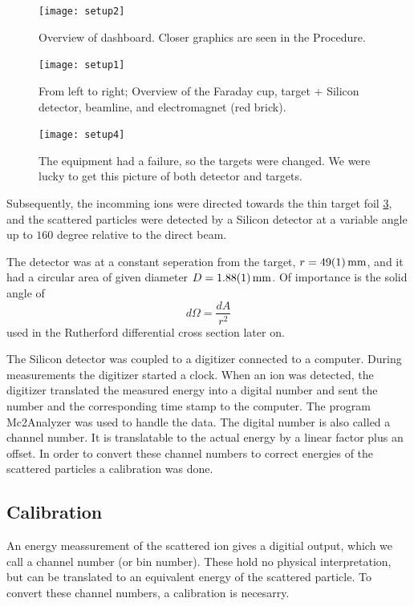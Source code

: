%
\begin{figure}[t]
    \centering
    \texttt{[image: setup2]}
    \caption{Overview of dashboard. Closer graphics are seen in the Procedure.}
    \label{fig_setup2}
\end{figure}
%
\begin{figure}[t]
    \centering
    \texttt{[image: setup1]}
    \caption{From left to right; Overview of the Faraday cup, target + Silicon detector, beamline, and electromagnet (red brick).}
    \label{fig_setup1}
\end{figure}
%
\begin{figure}[t]
    \centering
    \texttt{[image: setup4]}
    \caption{The equipment had a failure, so the targets were changed. We were
    lucky to get this picture of both detector and targets.}
    \label{fig_setup4}
\end{figure}
%
Subsequently, the incomming ions were directed towards the thin target foil
\cref{fig_setup4}, and the scattered particles were detected by a Silicon
detector at a variable angle up to $160$ degree relative to the
direct beam. 

The detector was at a constant seperation from the target, $r =
\SI{49\pm1}{\milli\meter}$, and it had a circular area of given diameter
$D=\SI{1.88 \pm 0.01}{\milli\meter}$. Of importance is the solid angle of 
\begin{equation}
d\Omega = \frac{dA}{r^2}
\end{equation}
used in the Rutherford differential cross section later on.

The Silicon detector was coupled to a digitizer connected to a computer. During
measurements the digitizer started a clock. When an ion was detected, the
digitizer translated the measured energy into a digital number and sent the
number and the corresponding time stamp to the computer.  The program
Mc2Analyzer was used to handle the data. The digital number is also called a
channel number. It is translatable to the actual energy by a linear factor plus
an offset. In order to convert these channel numbers to correct energies of the
scattered particles a calibration was done.

\subsection{Calibration}
An energy meassurement of the scattered ion gives a digitial output, which we call
a channel number (or bin number). These hold no physical interpretation, but
can be translated to an equivalent energy of the scattered particle. To
convert these channel numbers, a calibration is necesarry. 

